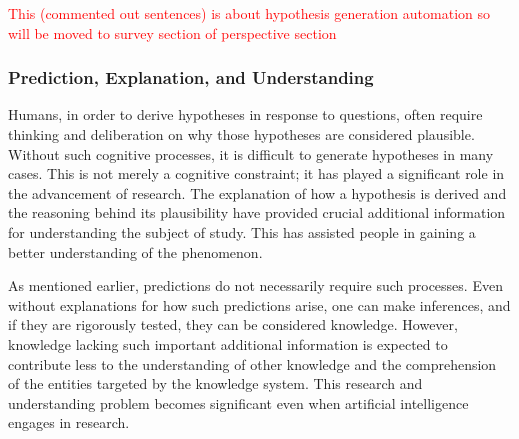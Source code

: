 \documentclass{book}
\begin{document}

\textcolor{red}{This (commented out sentences) is about hypothesis generation automation so will be moved to survey section of perspective section}

\subsubsection{Prediction, Explanation, and Understanding}
Humans, in order to derive hypotheses in response to questions, often require thinking and deliberation on why those hypotheses are considered plausible. Without such cognitive processes, it is difficult to generate hypotheses in many cases. This is not merely a cognitive constraint; it has played a significant role in the advancement of research. The explanation of how a hypothesis is derived and the reasoning behind its plausibility have provided crucial additional information for understanding the subject of study. This has assisted people in gaining a better understanding of the phenomenon.

As mentioned earlier, predictions do not necessarily require such processes. Even without explanations for how such predictions arise, one can make inferences, and if they are rigorously tested, they can be considered knowledge. However, knowledge lacking such important additional information is expected to contribute less to the understanding of other knowledge and the comprehension of the entities targeted by the knowledge system. This research and understanding problem becomes significant even when artificial intelligence engages in research.
\end{document}
